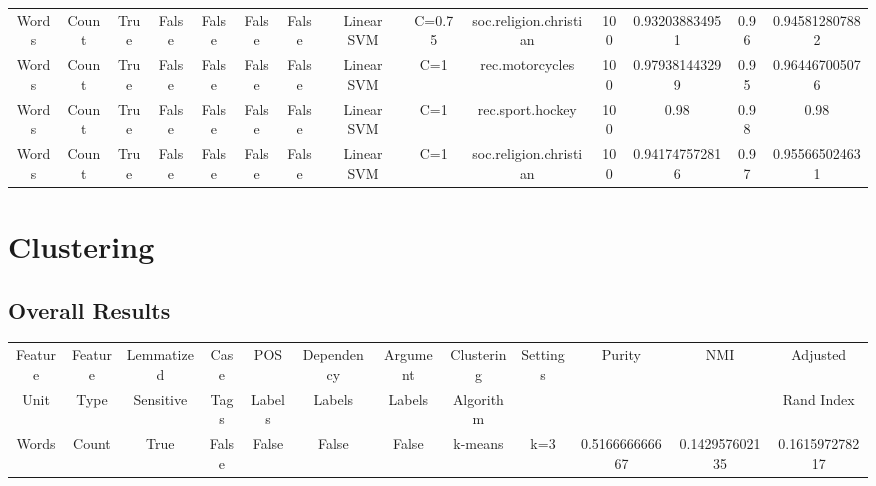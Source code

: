 \documentclass[11pt]{article}
\newcommand{\headcol}{\rowcolor{tableheadcolor}} %
\begin{document}
\begin{tabular}{|c|c|c|c|c|c|c|c|c|c|c|c|c|c|}
Words & Count & True & False & False & False & False & Linear SVM & C=0.75 & soc.religion.christian & 100 & 0.932038834951 & 0.96 & 0.945812807882 \\ 
Words & Count & True & False & False & False & False & Linear SVM & C=1 & rec.motorcycles & 100 & 0.979381443299 & 0.95 & 0.964467005076 \\ 
Words & Count & True & False & False & False & False & Linear SVM & C=1 & rec.sport.hockey & 100 & 0.98 & 0.98 & 0.98 \\ 
Words & Count & True & False & False & False & False & Linear SVM & C=1 & soc.religion.christian & 100 & 0.941747572816 & 0.97 & 0.955665024631 \\ 
\hline
  \end{tabular}
  
  \clearpage
 \section{Clustering}
 
 \subsection{Overall Results}
 
   \begin{tabular}{|c|c|c|c|c|c|c|c|c|c|c|c|}
  \hline
  \headcol \color{white}  Feature  & \color{white}  Feature  & \color{white}  Lemmatized & \color{white}  Case  & \color{white}   POS  & \color{white}   Dependency  & \color{white}   Argument  & \color{white}  Clustering  & \color{white} Settings  & \color{white} Purity & \color{white} NMI &\color{white}  Adjusted \\
\headcol  \color{white} Unit & \color{white}  Type & \color{white}  Sensitive & \color{white}  Tags & \color{white}   Labels &  \color{white}  Labels & \color{white}  Labels & \color{white}  Algorithm   & & & &  \color{white} Rand Index  \\
  \hline
  Words & Count & True & False & False & False & False & k-means & k=3 & 0.516666666667 & 0.142957602135 & 0.161597278217 \\ 

  \hline
  
  \end{tabular} 
  
  
\end{document}
